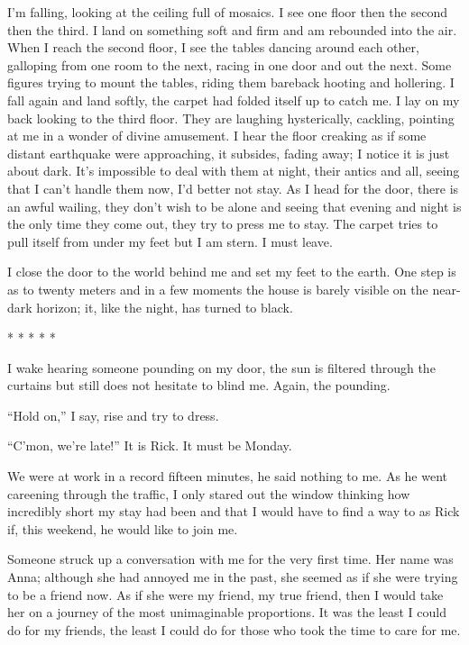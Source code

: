 I'm falling, looking at the ceiling full of mosaics. I see one floor
then the second then the third. I land on something soft and firm and am
rebounded into the air. When I reach the second floor, I see the tables
dancing around each other, galloping from one room to the next, racing
in one door and out the next. Some figures trying to mount the tables,
riding them bareback hooting and hollering. I fall again and land
softly, the carpet had folded itself up to catch me. I lay on my back
looking to the third floor. They are laughing hysterically, cackling,
pointing at me in a wonder of divine amusement. I hear the floor
creaking as if some distant earthquake were approaching, it subsides,
fading away; I notice it is just about dark. It's impossible to deal
with them at night, their antics and all, seeing that I can't handle
them now, I'd better not stay. As I head for the door, there is an awful
wailing, they don't wish to be alone and seeing that evening and night
is the only time they come out, they try to press me to stay. The carpet
tries to pull itself from under my feet but I am stern. I must leave.

I close the door to the world behind me and set my feet to the earth.
One step is as to twenty meters and in a few moments the house is barely
visible on the near-dark horizon; it, like the night, has turned to
black.

* * * * *

I wake hearing someone pounding on my door, the sun is filtered through
the curtains but still does not hesitate to blind me. Again, the
pounding.

``Hold on,'' I say, rise and try to dress.

``C'mon, we're late!'' It is Rick. It must be Monday.

We were at work in a record fifteen minutes, he said nothing to me. As
he went careening through the traffic, I only stared out the window
thinking how incredibly short my stay had been and that I would have to
find a way to as Rick if, this weekend, he would like to join me.

Someone struck up a conversation with me for the very first time. Her
name was Anna; although she had annoyed me in the past, she seemed as if
she were trying to be a friend now. As if she were my friend, my true
friend, then I would take her on a journey of the most unimaginable
proportions. It was the least I could do for my friends, the least I
could do for those who took the time to care for me.

